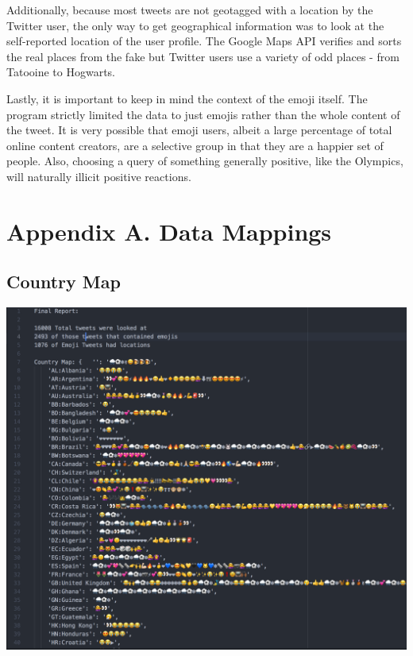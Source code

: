 \documentclass[a4paper,12pt]{article}
\begin{document}
Additionally, because most tweets are not geotagged with a location by the Twitter user, the only way to get geographical information was to look at the self-reported location of the user profile. The Google Maps API verifies and sorts the real places from the fake but Twitter users use a variety of odd places - from Tatooine to Hogwarts. 

Lastly, it is important to keep in mind the context of the emoji itself. The program strictly limited the data to just emojis rather than the whole content of the tweet. It is very possible that emoji users, albeit a large percentage of total online content creators, are a selective group in that they are a happier set of people. Also, choosing a query of something generally positive, like the Olympics, will naturally illicit positive reactions. 

\pagebreak
\section{Appendix A. Data Mappings}
\subsection{Country Map}
\includegraphics[scale=0.55]{datamap1.png}
\pagebreak
\end{document}
